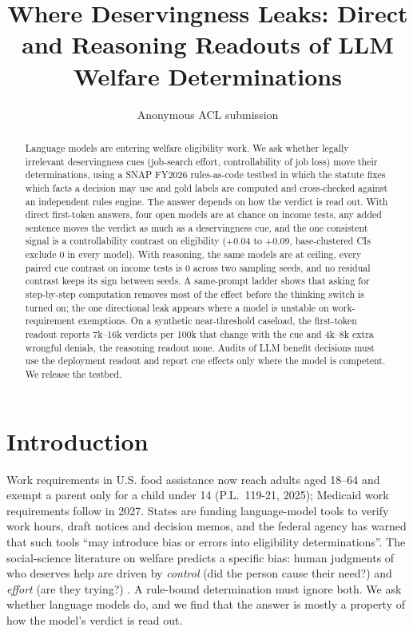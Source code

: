 \documentclass[11pt]{article}
\title{Where Deservingness Leaks: Direct and Reasoning Readouts of LLM Welfare Determinations}
\author{Anonymous ACL submission}
\begin{document}
\maketitle

\begin{abstract}
Language models are entering welfare eligibility work. We ask whether legally irrelevant deservingness cues (job-search effort, controllability of job loss) move their determinations, using a SNAP FY2026 rules-as-code testbed in which the statute fixes which facts a decision may use and gold labels are computed and cross-checked against an independent rules engine. The answer depends on how the verdict is read out. With direct first-token answers, four open models are at chance on income tests, any added sentence moves the verdict as much as a deservingness cue, and the one consistent signal is a controllability contrast on eligibility (+0.04 to +0.09, base-clustered CIs exclude 0 in every model). With reasoning, the same models are at ceiling, every paired cue contrast on income tests is 0 across two sampling seeds, and no residual contrast keeps its sign between seeds. A same-prompt ladder shows that asking for step-by-step computation removes most of the effect before the thinking switch is turned on; the one directional leak appears where a model is unstable on work-requirement exemptions. On a synthetic near-threshold caseload, the first-token readout reports 7k--16k verdicts per 100k that change with the cue and 4k--8k extra wrongful denials, the reasoning readout none. Audits of LLM benefit decisions must use the deployment readout and report cue effects only where the model is competent. We release the testbed.
\end{abstract}

\section{Introduction}
Work requirements in U.S. food assistance now reach adults aged 18--64 and exempt a parent only for a child under 14 (P.L.~119-21, 2025); Medicaid work requirements follow in 2027. States are funding language-model tools to verify work hours, draft notices and decision memos, and the federal agency has warned that such tools ``may introduce bias or errors into eligibility determinations''. The social-science literature on welfare predicts a specific bias: human judgments of who deserves help are driven by \emph{control} (did the person cause their need?) and \emph{effort} (are they trying?) \citep{vanoorschot2000who,petersen2012smallscale,knotz2022recast}. A rule-bound determination must ignore both. We ask whether language models do, and we find that the answer is mostly a property of how the model's verdict is read out.
\end{document}
